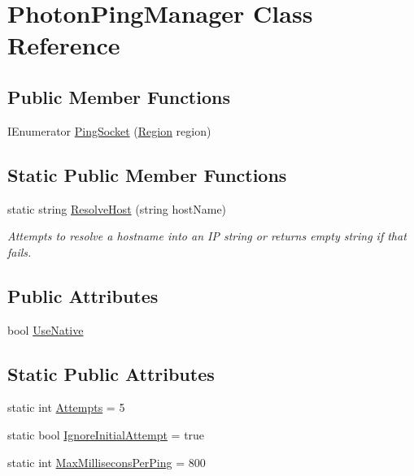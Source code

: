 \hypertarget{class_photon_ping_manager}{}\section{Photon\+Ping\+Manager Class Reference}
\label{class_photon_ping_manager}
\subsection*{Public Member Functions}
\begin{DoxyCompactItemize}
\item 
I\+Enumerator \hyperlink{class_photon_ping_manager_a0ece3c53b5e9db217825d5a3ba74a5f5}{Ping\+Socket} (\hyperlink{class_region}{Region} region)
\end{DoxyCompactItemize}
\subsection*{Static Public Member Functions}
\begin{DoxyCompactItemize}
\item 
static string \hyperlink{class_photon_ping_manager_a489f87655185eb46b0e15de0726c771c}{Resolve\+Host} (string host\+Name)
\begin{DoxyCompactList}\small\item\em Attempts to resolve a hostname into an IP string or returns empty string if that fails. \end{DoxyCompactList}\end{DoxyCompactItemize}
\subsection*{Public Attributes}
\begin{DoxyCompactItemize}
\item 
bool \hyperlink{class_photon_ping_manager_ab5bc2677649632ad08c581dff24cec4a}{Use\+Native}
\end{DoxyCompactItemize}
\subsection*{Static Public Attributes}
\begin{DoxyCompactItemize}
\item 
static int \hyperlink{class_photon_ping_manager_aa37a48018a49beafdb317dbdfbff6d54}{Attempts} = 5
\item 
static bool \hyperlink{class_photon_ping_manager_a0e897316745a60839e2ed3e80cefd2f2}{Ignore\+Initial\+Attempt} = true
\item 
static int \hyperlink{class_photon_ping_manager_ac0c24ceeeff3345bcf1d98bbe37b4014}{Max\+Millisecons\+Per\+Ping} = 800
\end{DoxyCompactItemize}
